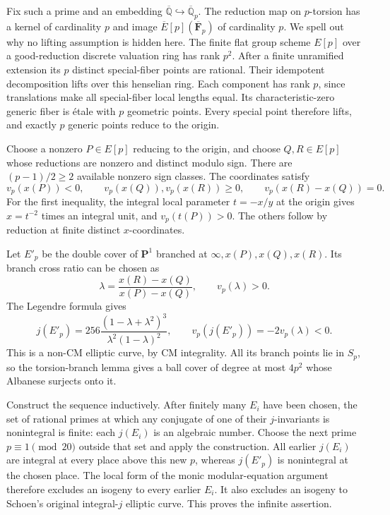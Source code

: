 \documentclass[11pt]{article}
\newcommand{\Q}{\mathbb Q}\newcommand{\C}{\mathbb C}\newcommand{\Z}{\mathbb Z}\newcommand{\R}{\mathbb R}\newcommand{\A}{\mathbb A}\newcommand{\OO}{\mathcal O}
\theoremstyle{definition}\newtheorem{definition}[theorem]{Definition}\newtheorem{remark}[theorem]{Remark}
\begin{document}
Fix such a prime and an embedding $\overline{\Q}\hookrightarrow
\overline{\Q}_p$.  The reduction map on $p$-torsion has a kernel of
cardinality $p$ and image $\overline E[p](\overline{\mathbf F}_p)$ of
cardinality $p$.  We spell out why no lifting assumption is hidden here.
The finite flat group scheme $E[p]$ over a good-reduction discrete
valuation ring has rank $p^2$.  After a finite unramified extension its
$p$ distinct special-fiber points are rational.  Their idempotent
decomposition lifts over this henselian ring.  Each component has rank
$p$, since translations make all special-fiber local lengths equal.
Its characteristic-zero generic fiber is \'{e}tale with $p$ geometric
points.  Every special point therefore lifts, and exactly $p$ generic
points reduce to the origin.

Choose a nonzero $P\in E[p]$ reducing to the origin, and choose
$Q,R\in E[p]$ whose reductions are nonzero and distinct modulo sign.
There are $(p-1)/2\geq2$ available nonzero sign classes.  The coordinates
satisfy
\[
 v_p(x(P))<0,\qquad
 v_p(x(Q)),v_p(x(R))\geq0,\qquad
 v_p(x(R)-x(Q))=0.
\]
For the first inequality, the integral local parameter $t=-x/y$ at the
origin gives $x=t^{-2}$ times an integral unit, and $v_p(t(P))>0$.
The others follow by reduction at finite distinct $x$-coordinates.

Let $E'_p$ be the double cover of $\mathbf P^1$ branched at
$\infty,x(P),x(Q),x(R)$.  Its branch cross ratio can be chosen as
\[
 \lambda=\frac{x(R)-x(Q)}{x(P)-x(Q)},\qquad v_p(\lambda)>0.
\]
The Legendre formula gives
\[
 j(E'_p)=256\frac{(1-\lambda+\lambda^2)^3}
                         {\lambda^2(1-\lambda)^2},
 \qquad v_p(j(E'_p))=-2v_p(\lambda)<0.
\]
This is a non-CM elliptic curve, by CM integrality.  All its branch points
lie in $S_p$, so the torsion-branch lemma gives a ball cover of degree at
most $4p^2$ whose Albanese surjects onto it.

Construct the sequence inductively.  After finitely many $E_i$ have been
chosen, the set of rational primes at which any conjugate of one of their
$j$-invariants is nonintegral is finite: each $j(E_i)$ is an algebraic
number.  Choose the next prime $p\equiv1\pmod{20}$ outside that set and
apply the construction.  All earlier $j(E_i)$ are integral at every
place above this new $p$, whereas $j(E'_p)$ is nonintegral at the chosen
place.  The local form of the monic modular-equation argument therefore
excludes an isogeny to every earlier $E_i$.  It also excludes an isogeny
to Schoen's original integral-$j$ elliptic curve.  This proves the infinite
assertion.
\end{document}
